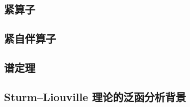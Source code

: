

\subsection{紧算子}
\label{b1:subsec:080501}

\subsection{紧自伴算子}
\label{b1:subsec:080502}

\subsection{谱定理}
\label{b1:subsec:080503}

\subsection{Sturm–Liouville 理论的泛函分析背景}
\label{b1:subsec:080504}


